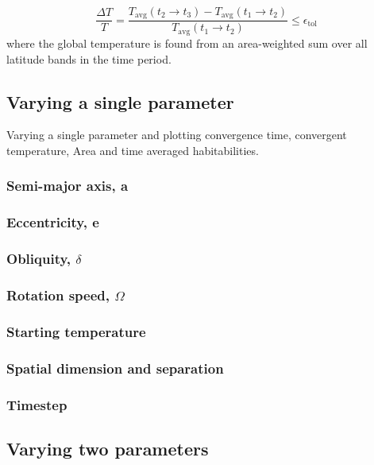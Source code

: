 \documentclass[12pt, onecolumn]{revtex4-2}    %
\begin{document}
\begin{equation*}
    \frac{\Delta T}{T} = \frac{T_{\text{avg}}(t_2 \to t_3) - T_{\text{avg}}(t_1 \to t_2)}{T_{\text{avg}}(t_1 \to t_2)}
    \le \epsilon_{\text{tol}}
\end{equation*}
where the global temperature is found from an area-weighted sum over all latitude bands in the time period.

\subsection{Varying a single parameter} \label{sec:single_param}

Varying a single parameter and plotting convergence time, convergent temperature, Area and time averaged habitabilities.

\subsubsection*{Semi-major axis, a}

\subsubsection*{Eccentricity, e}

\subsubsection*{Obliquity, $\delta$}

\subsubsection*{Rotation speed, $\Omega$}

\subsubsection*{Starting temperature}

\subsubsection*{Spatial dimension and separation}

\subsubsection*{Timestep}

\subsection{Varying two parameters} \label{sec:two_param}
\end{document}
